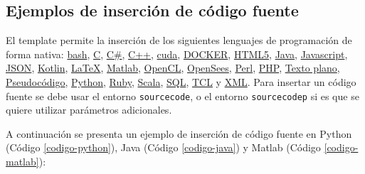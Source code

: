 		\lipsum[4]

		\begin{multicols}{2}

			\lipsum[4]


			\lipsum[1]

		\end{multicols}

	\subsection{Ejemplos de inserción de código fuente}

		\newcommand{\insertsrcmanual}[2]{\href{https://latex.ppizarror.com/informe.html\#hlp-srccode\&srctype=#1}{#2}}

		El template permite la inserción de los siguientes lenguajes de programación de forma nativa: \insertsrcmanual{bash}{bash}, \insertsrcmanual{c}{C}, \insertsrcmanual{csharp}{C\#}, \insertsrcmanual{cpp}{C++}, \insertsrcmanual{cuda}{cuda}, \insertsrcmanual{docker}{DOCKER}, \insertsrcmanual{html5}{HTML5}, \insertsrcmanual{java}{Java}, \insertsrcmanual{js}{Javascript}, \insertsrcmanual{json}{JSON}, \insertsrcmanual{kotlin}{Kotlin}, \insertsrcmanual{latex}{LaTeX}, \insertsrcmanual{matlab}{Matlab}, \insertsrcmanual{opencl}{OpenCL}, \insertsrcmanual{opensees}{OpenSees}, \insertsrcmanual{perl}{Perl}, \insertsrcmanual{php}{PHP}, \insertsrcmanual{plaintext}{Texto plano}, \insertsrcmanual{pseudocode}{Pseudocódigo}, \insertsrcmanual{python}{Python}, \insertsrcmanual{ruby}{Ruby}, \insertsrcmanual{scala}{Scala}, \insertsrcmanual{sql}{SQL}, \insertsrcmanual{tcl}{TCL} y \insertsrcmanual{xml}{XML}. Para insertar un código fuente se debe usar el entorno \texttt{sourcecode}, o el entorno \texttt{sourcecodep} si es que se quiere utilizar parámetros adicionales. \newp

		A continuación se presenta un ejemplo de inserción de código fuente en Python (Código \ref{codigo-python}), Java (Código \ref{codigo-java}) y Matlab (Código \ref{codigo-matlab}):

